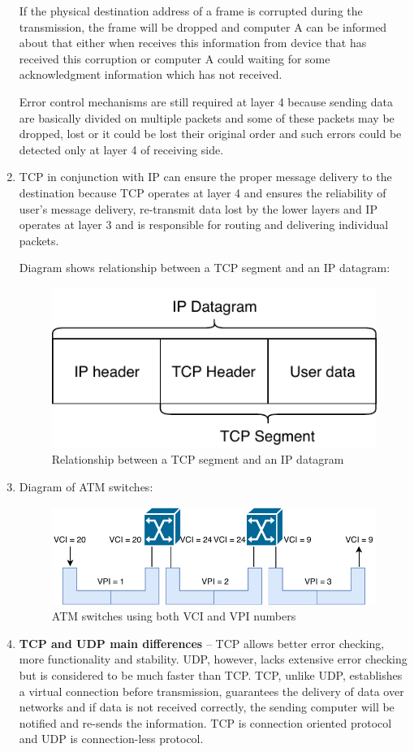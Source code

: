 \documentclass[a4paper, 11pt]{article}
\begin{document}
\begin{enumerate}
			If the physical destination address of a frame is corrupted during the transmission, the frame will
			be dropped and computer A can be informed about that either when receives this information from device
			that has received this corruption or computer A could waiting for some acknowledgment information which
			has not received.

			Error control mechanisms are still required at layer 4 because sending data are basically divided on multiple
			packets and some of these packets may be dropped, lost or it could be lost their original order and such errors
			could be detected only at layer 4 of receiving side.

		\item %
			TCP in conjunction with IP can ensure the proper message delivery to the destination because TCP operates at
			layer 4 and ensures the reliability of user's message delivery, re-transmit data lost by the lower layers and
			IP operates at layer 3 and is responsible for routing and delivering individual packets.

			Diagram shows relationship between a TCP segment and an IP datagram:
			\begin{figure}[ht]
				\centering
				\includegraphics[width=0.4\linewidth]{inc/tcp_ip_relation.pdf}
				\caption{Relationship between a TCP segment and an IP datagram}
				\label{figure:tcp_ip_relation}
			\end{figure}

		\item %
			Diagram of ATM switches:
			\begin{figure}[ht]
				\centering
				\includegraphics[width=0.7\linewidth]{inc/atm_switch.pdf}
				\caption{ATM switches using both VCI and VPI numbers}
				\label{figure:atm_switch}
			\end{figure}

		\item %
			\textbf{TCP and UDP main differences} -- TCP allows better error checking, more functionality and stability.
			UDP, however, lacks extensive error checking but is considered to be much faster than TCP.
			TCP, unlike UDP, establishes a virtual connection before transmission, guarantees the delivery of data over
			networks and if data is not received correctly, the sending computer will be notified and re-sends the
			information. TCP is connection oriented protocol and UDP is connection-less protocol.


\end{enumerate}
\end{document}
